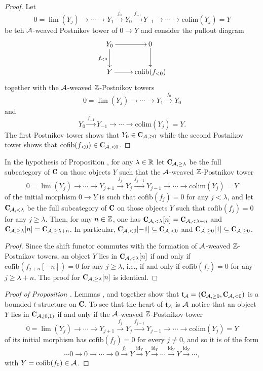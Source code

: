 \documentclass[a4paper,12pt]{amsart}
\begin{document}
\begin{proof}
Let
\[
0 =\lim(Y_j)\to\cdots \to Y_{1} \xrightarrow{f_{0}} Y_{0} \xrightarrow{f_{-1}}Y_{-1}\to \cdots\to \mathrm{colim}(Y_j)=Y
\]
be teh $\mathcal{A}$-weaved Postnikov tower of $0\to Y$ and consider the pullout diagram
\[
\xymatrix{
Y_0\ar[r]\ar[d]_{f_{<0}}&0\ar[d]\\
Y\ar[r]&\mathrm{cofib}(f_{<0})
}\]
together with the $\mathcal{A}$-weaved $\mathbb{Z}$-Postnikov towers
\[
0 =\lim(Y_j)\to\cdots \to Y_{1} \xrightarrow{f_{0}} Y_{0} 
\]
and
\[
Y_{0}\xrightarrow{f_{-1}}Y_{-1}\to \cdots\to \mathrm{colim}(Y_j)=Y.
\]
The first Postnikov tower shows that $Y_0\in \C_{\A,\geq 0}$ while the second Postnikov tower shows that $\mathrm{cofib}(f_{<0})\in  \C_{\A,<0}$.
\end{proof}
\begin{lemma}\label{tre}
In the hypothesis of Proposition , for any $\lambda\in \mathbb{R}$ let
$\C_{\A,\geq \lambda}$ be the full subcategory of $\C$ on those objects $Y$ such that  the $\mathcal{A}$-weaved $\mathbb{Z}$-Postnikov tower
\[
0 =\lim(Y_j)\to\cdots \to Y_{j+1} \xrightarrow{f_{j}} Y_{j} \xrightarrow{f_{j-1}}Y_{j-1}\to \cdots\to \mathrm{colim}(Y_j)=Y
\]
of the initial morphism $0\to Y$ is such that $\mathrm{cofib}(f_j)=0$ for any $j<\lambda$, and let $\C_{\A,< \lambda}$ be the full subcategory of $\C$ on those objects $Y$ such that $\mathrm{cofib}(f_j)=0$ for any $j\geq \lambda$. 
Then, for any $n\in\mathbb{Z}$, one has $\C_{\A,< \lambda}[n]=\C_{\A,< \lambda+n}$ and $\C_{\A,\geq \lambda}[n]=\C_{\A,\geq \lambda+n}$. In particular, $\C_{\A,<0}[-1]\subseteq \C_{\A,<0}$ and $\C_{\A,\geq 0}[1]\subseteq\C_{\A,\geq 0}$.
\end{lemma}
\begin{proof}
Since the shift functor commutes with the formation of  $\mathcal{A}$-weaved $\mathbb{Z}$-Postnikov towers, an object $Y$ lies in $\C_{\A,< \lambda}[n]$ if and only if $\mathrm{cofib}(f_{j+n}[-n])=0$ for any $j\geq \lambda$, i.e.,  if and only if $\mathrm{cofib}(f_j)=0$ for any $j\geq \lambda+n$.
The proof for $\C_{\A,\geq \lambda}[n]$ is identical.
\end{proof}
\begin{proof}[Proof of Proposition ]
Lemmas ,  and  together show that $\mathfrak{t}_\A=(\C_{\A,\geq 0}, \C_{\A,<0})$ is a bounded $t$-structure on $\C$. To see that the heart of  $\mathfrak{t}_{\mathcal{A}}$ is $\mathcal{A}$ notice that an object $Y$ lies in $\C_{\A,[0,1)}$ if and only if the $\mathcal{A}$-weaved $\mathbb{Z}$-Postnikov tower
\[
0 =\lim(Y_j)\to\cdots \to Y_{j+1} \xrightarrow{f_{j}} Y_{j} \xrightarrow{f_{j-1}}Y_{j-1}\to \cdots\to \mathrm{colim}(Y_j)=Y
\]
of its initial morphism has $\mathrm{cofib}(f_j)=0$ for every $j\neq0$, and so it is of the form
\[
\cdots 0 \to 0\to \cdots \to 0\xrightarrow{f_{0}} Y \xrightarrow{\mathrm{id}_Y}Y\xrightarrow{\mathrm{id}_Y} \cdots\xrightarrow{\mathrm{id}_Y}Y\xrightarrow{\mathrm{id}_Y}\cdots,\] 
with $Y=\mathrm{cofib}(f_0)\in \mathcal{A}$.
\end{proof}
\end{document}
